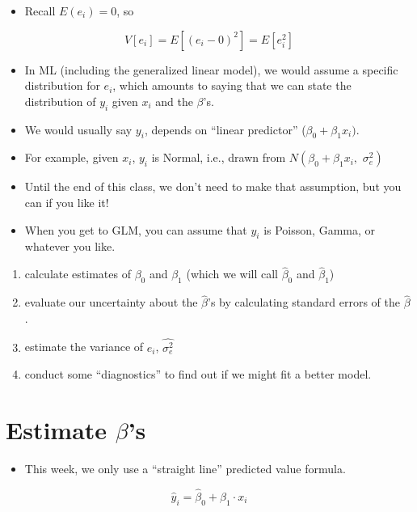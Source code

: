 \documentclass[10pt,english]{beamer}
\def\lyxframeend{} %
\begin{document}
\begin{itemize}
\item Recall $E(e_{i})=0$, so
\end{itemize}
\[
V[e_{i}]=E[(e_{i}-0)^{2}]=E[e_{i}^{2}]
\]



\lyxframeend{}
\begin{itemize}
\item In ML (including the generalized linear model), we would assume a
specific distribution for $e_{i}$, which amounts to saying that we
can state the distribution of $y_{i}$ given $x_{i}$ and the $\beta$'s. 
\item We would usually say $y_{i}$, depends on ``linear predictor'' ($\beta_{0}+\beta_{1}x_{i})$.
\item For example, given $x_{i}$, $y_{i}$ is Normal, i.e., drawn from
$N(\beta_{0}+\beta_{1}x_{i},\,\,\sigma_{e}^{2})$
\item Until the end of this class, we don't need to make that assumption,
but you can if you like it! 
\item When you get to GLM, you can assume that $y_{i}$ is Poisson, Gamma,
or whatever you like.
\end{itemize}

\lyxframeend{}
\begin{enumerate}
\item calculate estimates of $\beta_{0}$ and $\beta_{1}$ (which we will
call $\hat{\beta}_{0}$ and $\hat{\beta}_{1}$) 
\item evaluate our uncertainty about the $\hat{\beta}$'s by calculating
standard errors of the $\hat{\beta}$.
\item estimate the variance of $e_{i}$, $\widehat{\sigma_{e}^{2}}$
\item conduct some ``diagnostics'' to find out if we might fit a better
model.
\end{enumerate}

\lyxframeend{}\section{Estimate $\beta$'s}


\lyxframeend{}
\begin{itemize}
\item This week, we only use a ``straight line'' predicted value formula. 
\end{itemize}
\begin{equation}
\hat{y}_{i}=\hat{\beta}_{0}+\hat{\beta}_{1}\cdot x_{i}
\end{equation}
\end{document}
